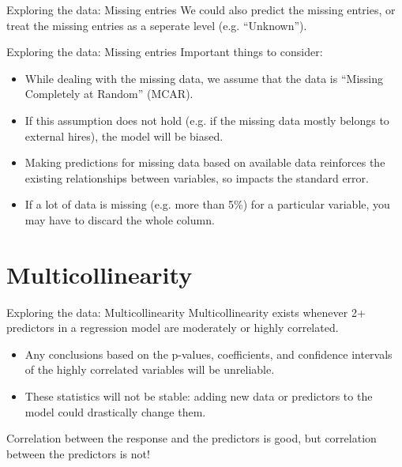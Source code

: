 \documentclass{beamer}\usepackage[]{graphicx}\usepackage[]{color}
\begin{document}
\begin{darkframes}
\begin{frame}[fragile]{Exploring the data: Missing entries}
      We could also predict the missing entries, or treat the missing entries as a seperate level (e.g. ``Unknown'').
    \end{frame}
  
  
  
    \begin{frame}[fragile]{Exploring the data: Missing entries}
      \alert{Important things to consider:}
      \begin{itemize}[<+->]
        \item While dealing with the missing data, we assume that the data is ``Missing Completely at Random'' (MCAR).
        \item If this assumption does not hold (e.g. if the missing data mostly belongs to external hires), the model will  be biased.        
        \item Making predictions for missing data based on available data reinforces the existing relationships between variables, so impacts the standard error.
        \item If a lot of data is missing (e.g. more than 5\%) for a particular variable, you may have to discard the whole column. 
      \end{itemize}
    \end{frame}
    
    \section{Multicollinearity}
    
    \begin{frame}[fragile]{Exploring the data: Multicollinearity}
      Multicollinearity exists whenever 2+ predictors in a regression model are moderately or highly correlated. \pause
      \begin{itemize}[<+->]
        \item Any conclusions based on the p-values, coefficients, and confidence intervals of the highly correlated variables will be unreliable.
        \item These statistics will not be stable: adding new data or predictors to the model could drastically change them.
      \end{itemize}
  
      Correlation between the response and the predictors is good, but correlation between the predictors is not!
    \end{frame}
    
    
    

\end{darkframes}
\end{document}
